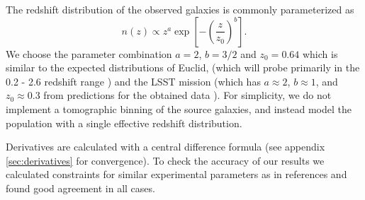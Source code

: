 \documentclass[11pt]{article} %
\newcommand{\br}[1]{\ensuremath{\left( #1 \right)}}
\newcommand{\sbr}[1]{\ensuremath{\left[ #1 \right]}}
\begin{document}

The redshift distribution of the observed galaxies is commonly parameterized as \cite{bartelmann2001weak}
\begin{equation*}
    n(z) \propto z^a \exp\sbr{-\br{\frac{z}{z_0}}^b}.
\end{equation*}
We choose the parameter combination $a = 2$, $b = 3/2$ and $z_0 = 0.64$ which is similar to the expected distributions of Euclid, (which will probe primarily in the 0.2 - 2.6 redshift range \cite{euclidprep10})
and the LSST mission (which has $a \approx 2$, $b \approx 1$, and $z_0 \approx 0.3$ from predictions for the obtained data \cite{lsstsciencebookchapter3}). For simplicity, we do not implement a tomographic binning of the source galaxies, and instead model the population with a single effective redshift distribution.

Derivatives are calculated with a central difference formula (see appendix \ref{sec:derivatives} for convergence).  To check the accuracy of our results we calculated constraints for similar experimental parameters as in references \cite{Planck2018Lensing, Takada2003, Namikawa_2016} and found good agreement in all cases.
\end{document}
